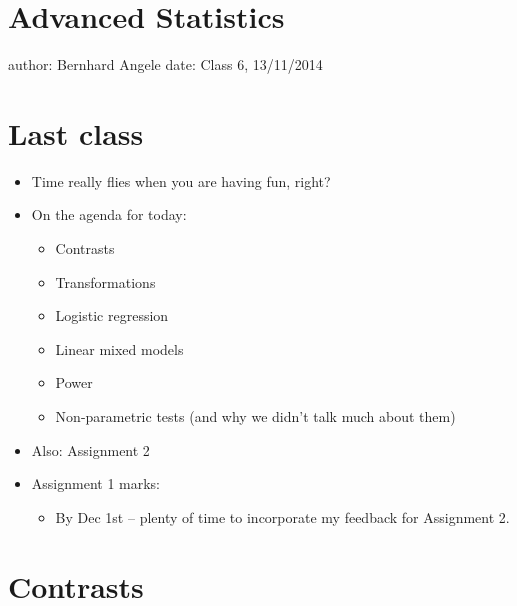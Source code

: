 \documentclass[]{article}
\author{}
\date{}
\begin{document}
\section{Advanced Statistics}\label{advanced-statistics}

author: Bernhard Angele date: Class 6, 13/11/2014

\section{Last class}\label{last-class}

\begin{itemize}
\itemsep1pt\parskip0pt
\item
  Time really flies when you are having fun, right?
\item
  On the agenda for today:

  \begin{itemize}
  \itemsep1pt\parskip0pt
  \item
    Contrasts
  \item
    Transformations
  \item
    Logistic regression
  \item
    Linear mixed models
  \item
    Power
  \item
    Non-parametric tests (and why we didn't talk much about them)
  \end{itemize}
\item
  Also: Assignment 2
\item
  Assignment 1 marks:

  \begin{itemize}
  \itemsep1pt\parskip0pt
  \item
    By Dec 1st -- plenty of time to incorporate my feedback for
    Assignment 2.
  \end{itemize}
\end{itemize}

\section{Contrasts}\label{contrasts}
\end{document}
